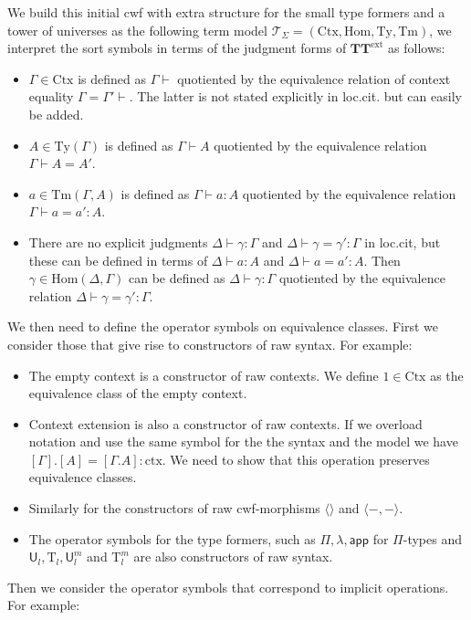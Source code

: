 \documentclass[11pt,a4paper]{article}
\theoremstyle{plain}
\theoremstyle{definition}
\newcommand{\app}[2]{{#1\,#2}} %
\newcommand{\Ctx}{\mathrm{Ctx}}
\newcommand{\Sub}{\mathrm{Hom}}
\newcommand{\Ty}{\mathrm{Ty}}
\newcommand{\Tm}{\mathrm{Tm}}
\newcommand{\T}{\mathsf{T}}
\newcommand{\ctx}{\mathrm{ctx}}
\newcommand{\tuple}[1]{\langle #1 \rangle}
\def\app{\mathsf{app}}
\def\U{\mathsf{U}}
\def\T{\mathcal{T}}
\newcommand{\Ta}{\mathrm{T}}
\def\TText{{\mathbf{TT}^\mathrm{ext}}}
\begin{document}
We build this initial cwf with extra structure for the small type formers and a tower of universes as the following term model $\T_\Sigma = (\Ctx,\Sub,\Ty,\Tm)$, we interpret the sort symbols in terms of the judgment forms of $\TText$ as follows:
\begin{itemize}
\item $\Gamma \in \Ctx$ is defined as $\Gamma \vdash$ quotiented by the equivalence relation of context equality $\Gamma = \Gamma' \vdash$. The latter is not stated explicitly in loc.cit. but can easily be added.
\item $A \in \Ty(\Gamma)$ is defined as $\Gamma \vdash A$ quotiented by the equivalence relation $\Gamma \vdash A = A'$.
\item $a \in \Tm(\Gamma,A)$ is defined as $\Gamma \vdash a : A$ quotiented by the equivalence relation $\Gamma \vdash a = a' : A$.
\item There are no explicit judgments $\Delta \vdash \gamma : \Gamma$ and $\Delta \vdash \gamma = \gamma' : \Gamma$  in loc.cit, but these can be defined in terms of $\Delta \vdash a : A$ and $\Delta \vdash a = a' : A$. Then $\gamma \in \Sub(\Delta,\Gamma)$ can be defined as $\Delta \vdash \gamma : \Gamma$ quotiented by the equivalence relation $\Delta \vdash  \gamma = \gamma' : \Gamma$.
\end{itemize}
We then need to define the operator symbols on equivalence classes. First we consider those that give rise to constructors of raw syntax. For example:
\begin{itemize}
\item The empty context is a constructor of raw contexts. We define $1 \in \Ctx$ as the equivalence class of the empty context.
\item Context extension is also a constructor of raw contexts. If we overload notation and use the same symbol for the the syntax and the model we have $[\Gamma].[A] = [\Gamma.A]: \ctx$. We need to show that this operation preserves equivalence classes.
\item Similarly for the constructors of raw cwf-morphisms $\tuple{}$ and $\tuple{-,-}$.
\item The operator symbols for the type formers, such as $\Pi, \lambda, \app$ for $\Pi$-types and $\U_l, \Ta_l, \U^m_l$ and $\Ta^m_l$ are also constructors of raw syntax.
\end{itemize}
Then we consider the operator symbols that correspond to implicit operations. For example:
\end{document}

